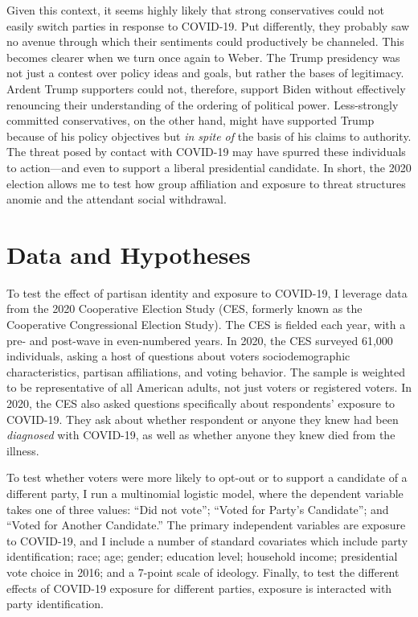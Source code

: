 \documentclass[
  12pt,
]{article}
\begin{document}
Given this context, it seems highly likely that strong conservatives could not easily switch parties in response to COVID-19. Put differently, they probably saw no avenue through which their sentiments could productively be channeled. This becomes clearer when we turn once again to Weber. The Trump presidency was not just a contest over policy ideas and goals, but rather the bases of legitimacy. Ardent Trump supporters could not, therefore, support Biden without effectively renouncing their understanding of the ordering of political power. Less-strongly committed conservatives, on the other hand, might have supported Trump because of his policy objectives but \emph{in spite of} the basis of his claims to authority. The threat posed by contact with COVID-19 may have spurred these individuals to action---and even to support a liberal presidential candidate. In short, the 2020 election allows me to test how group affiliation and exposure to threat structures anomie and the attendant social withdrawal.

\hypertarget{data-and-hypotheses}{%
\section*{Data and Hypotheses}\label{data-and-hypotheses}}

To test the effect of partisan identity and exposure to COVID-19, I leverage data from the 2020 Cooperative Election Study (CES, formerly known as the Cooperative Congressional Election Study). The CES is fielded each year, with a pre- and post-wave in even-numbered years. In 2020, the CES surveyed 61,000 individuals, asking a host of questions about voters sociodemographic characteristics, partisan affiliations, and voting behavior. The sample is weighted to be representative of all American adults, not just voters or registered voters. In 2020, the CES also asked questions specifically about respondents' exposure to COVID-19. They ask about whether respondent or anyone they knew had been \emph{diagnosed} with COVID-19, as well as whether anyone they knew died from the illness.

To test whether voters were more likely to opt-out or to support a candidate of a different party, I run a multinomial logistic model, where the dependent variable takes one of three values: ``Did not vote''; ``Voted for Party's Candidate''; and ``Voted for Another Candidate.'' The primary independent variables are exposure to COVID-19, and I include a number of standard covariates which include party identification; race; age; gender; education level; household income; presidential vote choice in 2016; and a 7-point scale of ideology. Finally, to test the different effects of COVID-19 exposure for different parties, exposure is interacted with party identification.
\end{document}
